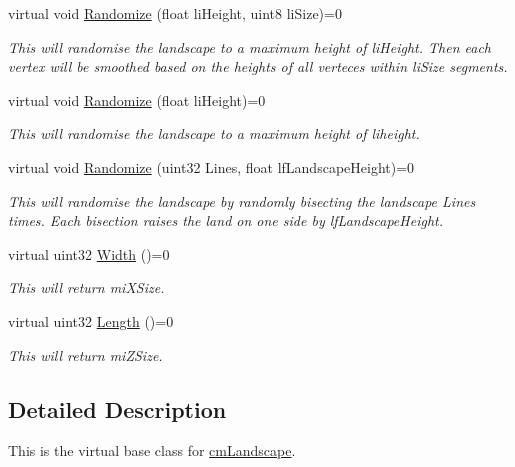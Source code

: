 \begin{DoxyCompactItemize}
virtual void \hyperlink{classvm_landscape_a3ce4544919ef53f1cc1f2283a51f202e}{Randomize} (float liHeight, uint8 liSize)=0
\begin{DoxyCompactList}\small\item\em This will randomise the landscape to a maximum height of liHeight. Then each vertex will be smoothed based on the heights of all verteces within liSize segments. \item\end{DoxyCompactList}\item 
virtual void \hyperlink{classvm_landscape_adb80c819fc1d5041be1fb52fbc5194a2}{Randomize} (float liHeight)=0
\begin{DoxyCompactList}\small\item\em This will randomise the landscape to a maximum height of liheight. \item\end{DoxyCompactList}\item 
virtual void \hyperlink{classvm_landscape_adfad55b0bc5536f842421feb225a56f9}{Randomize} (uint32 Lines, float lfLandscapeHeight)=0
\begin{DoxyCompactList}\small\item\em This will randomise the landscape by randomly bisecting the landscape Lines times. Each bisection raises the land on one side by lfLandscapeHeight. \item\end{DoxyCompactList}\item 
virtual uint32 \hyperlink{classvm_landscape_a95581c7e2e9e9b55e924a18641c6d744}{Width} ()=0
\begin{DoxyCompactList}\small\item\em This will return miXSize. \item\end{DoxyCompactList}\item 
virtual uint32 \hyperlink{classvm_landscape_a96714ceab8688ab5d1a62ae4d077de6a}{Length} ()=0
\begin{DoxyCompactList}\small\item\em This will return miZSize. \item\end{DoxyCompactList}\end{DoxyCompactItemize}


\subsection{Detailed Description}
This is the virtual base class for \hyperlink{classcm_landscape}{cmLandscape}. 

